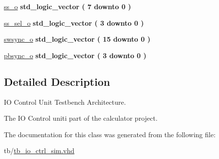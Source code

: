 \begin{DoxyCompactItemize}
\hyperlink{classio__ctrl_1_1sim_ab0b21dc4dda12e78f77faa985fda48d0}{ss\+\_\+o} {\bfseries \textcolor{vhdlchar}{std\+\_\+logic\+\_\+vector}\textcolor{vhdlchar}{ }\textcolor{vhdlchar}{(}\textcolor{vhdlchar}{ }\textcolor{vhdlchar}{ } \textcolor{vhdldigit}{7} \textcolor{vhdlchar}{ }\textcolor{vhdlchar}{downto}\textcolor{vhdlchar}{ }\textcolor{vhdlchar}{ } \textcolor{vhdldigit}{0} \textcolor{vhdlchar}{ }\textcolor{vhdlchar}{)}\textcolor{vhdlchar}{ }} 
\item 
\mbox{\label{classio__ctrl_1_1sim_ae2dd1c6fda7cb4a3d9df11cac49d5ba9}} 
\hyperlink{classio__ctrl_1_1sim_ae2dd1c6fda7cb4a3d9df11cac49d5ba9}{ss\+\_\+sel\+\_\+o} {\bfseries \textcolor{vhdlchar}{std\+\_\+logic\+\_\+vector}\textcolor{vhdlchar}{ }\textcolor{vhdlchar}{(}\textcolor{vhdlchar}{ }\textcolor{vhdlchar}{ } \textcolor{vhdldigit}{3} \textcolor{vhdlchar}{ }\textcolor{vhdlchar}{downto}\textcolor{vhdlchar}{ }\textcolor{vhdlchar}{ } \textcolor{vhdldigit}{0} \textcolor{vhdlchar}{ }\textcolor{vhdlchar}{)}\textcolor{vhdlchar}{ }} 
\item 
\mbox{\label{classio__ctrl_1_1sim_a520bda20a1a041dd2480ab8773097342}} 
\hyperlink{classio__ctrl_1_1sim_a520bda20a1a041dd2480ab8773097342}{swsync\+\_\+o} {\bfseries \textcolor{vhdlchar}{std\+\_\+logic\+\_\+vector}\textcolor{vhdlchar}{ }\textcolor{vhdlchar}{(}\textcolor{vhdlchar}{ }\textcolor{vhdlchar}{ } \textcolor{vhdldigit}{15} \textcolor{vhdlchar}{ }\textcolor{vhdlchar}{downto}\textcolor{vhdlchar}{ }\textcolor{vhdlchar}{ } \textcolor{vhdldigit}{0} \textcolor{vhdlchar}{ }\textcolor{vhdlchar}{)}\textcolor{vhdlchar}{ }} 
\item 
\mbox{\label{classio__ctrl_1_1sim_a47817054e5c040044217f0d8d20adc72}} 
\hyperlink{classio__ctrl_1_1sim_a47817054e5c040044217f0d8d20adc72}{pbsync\+\_\+o} {\bfseries \textcolor{vhdlchar}{std\+\_\+logic\+\_\+vector}\textcolor{vhdlchar}{ }\textcolor{vhdlchar}{(}\textcolor{vhdlchar}{ }\textcolor{vhdlchar}{ } \textcolor{vhdldigit}{3} \textcolor{vhdlchar}{ }\textcolor{vhdlchar}{downto}\textcolor{vhdlchar}{ }\textcolor{vhdlchar}{ } \textcolor{vhdldigit}{0} \textcolor{vhdlchar}{ }\textcolor{vhdlchar}{)}\textcolor{vhdlchar}{ }} 
\end{DoxyCompactItemize}


\subsection{Detailed Description}
IO Control Unit Testbench Architecture. 

The IO Control uniti part of the calculator project. 

The documentation for this class was generated from the following file\+:\begin{DoxyCompactItemize}
\item 
tb/\hyperlink{tb__io__ctrl__sim_8vhd}{tb\+\_\+io\+\_\+ctrl\+\_\+sim.\+vhd}\end{DoxyCompactItemize}
